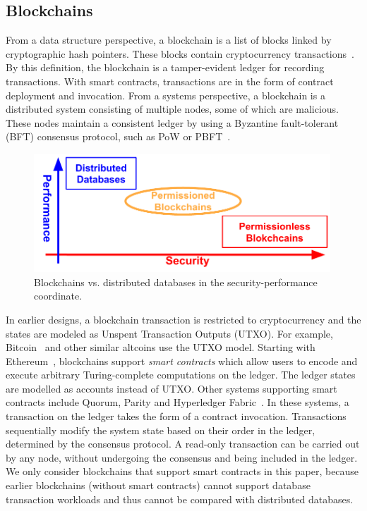 \subsection{Blockchains}
From a data structure perspective, a blockchain is a list of blocks linked by
cryptographic hash pointers. These blocks contain cryptocurrency
transactions~\cite{nakamoto2019bitcoin}. By this definition, the blockchain is a
tamper-evident ledger for recording transactions. With smart contracts,
transactions are in the form of contract deployment and invocation.
From a systems perspective, a blockchain is a distributed system consisting of
multiple nodes, some of which are malicious. These nodes maintain a consistent
ledger by using a Byzantine fault-tolerant (BFT) consensus protocol, such as PoW
or PBFT~\cite{castro1999practical}.

\begin{figure}[tp]
  \centering
  \includegraphics[width=0.99\textwidth]{diagram/twin/spectrum.pdf}
  \caption{Blockchains vs. distributed databases in the security-performance coordinate.}
  \label{diagram:twin:spectrum}
 \end{figure}


In earlier designs, a blockchain transaction is restricted to cryptocurrency and
the states are modeled as Unspent Transaction Outputs (UTXO).  For example,
Bitcoin~\cite{nakamoto2019bitcoin} and other similar altcoins use the UTXO
model.  Starting with Ethereum~\cite{web:ethereum}, blockchains support
\textit{smart contracts} which allow users to encode and execute arbitrary
Turing-complete computations on the ledger. The ledger states are modelled as
accounts instead of UTXO.
Other systems supporting smart contracts include Quorum, Parity and Hyperledger
Fabric~\cite{androulaki2018hyperledger}.  In these systems, a transaction on the
ledger takes the form of a contract invocation.
Transactions sequentially modify the system state based on their order in the
ledger, determined by the consensus protocol. A read-only transaction can be
carried out by any node, without undergoing the consensus and being included in
the ledger. We only consider blockchains that support smart contracts in this
paper, because earlier blockchains (without smart contracts) cannot support
database transaction workloads and thus cannot be compared with distributed
databases.

